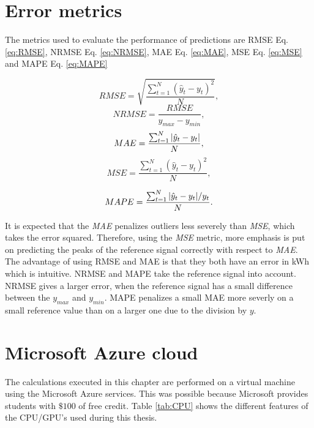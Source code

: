 \section{Error metrics}\label{s:Error metrics}
The metrics used to evaluate the performance of predictions are  RMSE Eq. \ref{eq:RMSE}, NRMSE Eq. \ref{eq:NRMSE},  MAE  Eq. \ref{eq:MAE},  MSE Eq. \ref{eq:MSE} and MAPE Eq. \ref{eq:MAPE}

\begin{equation}\label{eq:RMSE}
	RMSE = \sqrt{\frac{\sum_{t=1}^{N}(\hat{y}_t-y_t)^2}{N}},
\end{equation}
\begin{equation}\label{eq:NRMSE}
	NRMSE = \frac{RMSE}{y_{max}-y_{min}},
\end{equation}
\begin{equation}\label{eq:MAE}
	MAE = \frac{\sum_{t=1}^{N}\abs{\hat{y}_t-y_t}}{N},
\end{equation}
\begin{equation}\label{eq:MSE}
	MSE = \frac{\sum_{t=1}^{N}(\hat{y}_t-y_t)^2}{N},
\end{equation}

\begin{equation}\label{eq:MAPE}
	MAPE = \frac{\sum_{t=1}^{N}\abs{\hat{y}_t-y_t}/y_t}{N}.
\end{equation}


It is expected that the \textit{MAE} penalizes outliers less severely than \textit{MSE}, which takes the error squared. Therefore, using the \textit{MSE} metric, more emphasis is put on predicting the peaks of the reference signal correctly with respect to \textit{MAE}. The advantage of using  RMSE  and MAE  is that they both have an error in kWh which is intuitive.  NRMSE  and  MAPE  take the reference signal into account. NRMSE  gives a larger error, when the reference signal has a small difference between the $ y_{max} $ and $ y_{min} $.  MAPE  penalizes a small MAE more severly on a small reference value than on a larger one due to the division by $ y $.


\section{Microsoft Azure cloud}\label{s:Microsoft Azure cloud}
The calculations executed in this chapter are performed on a virtual machine using the Microsoft Azure services. This was possible because Microsoft provides students with $ \$ 100 $ of free credit. Table \ref{tab:CPU} shows the different features of the CPU/GPU's used during this thesis. 

